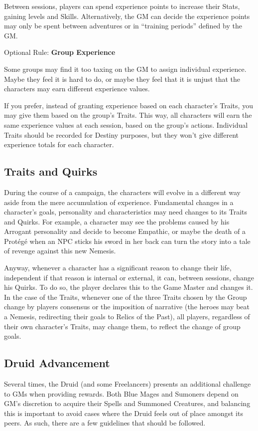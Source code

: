 \begin{multicols}{2}
Between sessions, players can spend experience points to increase their Stats, gaining levels and Skills. Alternatively, the GM can decide the experience points may only be spent  between adventures or  in “training periods” defined by the GM\@. 

\begin{boco}
Optional Rule: \textbf{Group Experience}\pc%

Some groups may find it too taxing on the GM to assign individual experience. Maybe they feel it is hard to do, or maybe they feel that it is unjust that the characters may earn different experience values.

If you prefer, instead of granting experience based on each character's Traits, you may give them based on the group's Traits. This way, all characters will earn the same experience values at each session, based on the group's actions. Individual Traits should be recorded for Destiny purposes, but they won't give different experience totals for each character.
\end{boco}

\subsection{Traits and Quirks}\label{subsec:gm-traits}
During the course of a campaign, the characters will evolve in a different way aside from the mere accumulation of experience. Fundamental changes in a character’s goals, personality and characteristics may need changes to its Traits and Quirks. For example, a character may see the problems caused by his Arrogant personality and decide to become Empathic, or maybe the death of a Protégé when an NPC sticks his sword in her back can turn the story into a tale of revenge against this new Nemesis.

Anyway, whenever a character has a significant reason to change their life, independent if that reason is internal or external, it can, between sessions, change his Quirks. To do so, the player declares this to the Game Master and changes it. In the case of the Traits, whenever one of the three Traits chosen by the Group change by players consensus or the imposition of narrative (the heroes may beat a Nemesis, redirecting their goals to Relics of the Past), all players, regardless of their own character’s Traits, may change them, to reflect the change of group goals.

\subsection{Druid Advancement}\label{subsec:gm-druid}
Several times, the Druid (and some Freelancers) presents an additional challenge to GMs when providing rewards. Both Blue Mages and Sumoners depend on GM's discretion to acquire their Spells and Summoned Creatures, and balancing this is important to avoid cases where the Druid feels out of place amongst its peers. As such, there are a few guidelines that should be followed.


\end{multicols}
